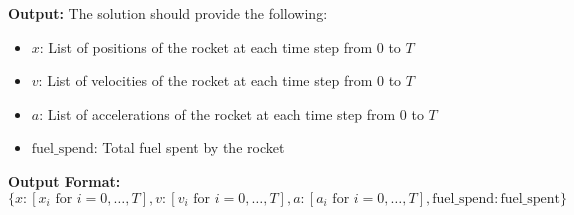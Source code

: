 \documentclass{article}
\begin{document}
\textbf{Output:}
The solution should provide the following:
\begin{itemize}
    \item \( x \): List of positions of the rocket at each time step from 0 to \( T \)
    \item \( v \): List of velocities of the rocket at each time step from 0 to \( T \)
    \item \( a \): List of accelerations of the rocket at each time step from 0 to \( T \)
    \item \( \text{fuel\_spend} \): Total fuel spent by the rocket
\end{itemize}

\textbf{Output Format:}
\[
\{
    x: [x_i \text{ for } i = 0, \ldots, T],
    v: [v_i \text{ for } i = 0, \ldots, T],
    a: [a_i \text{ for } i = 0, \ldots, T],
    \text{fuel\_spend}: \text{fuel\_spent}
\}
\]
\end{document}
